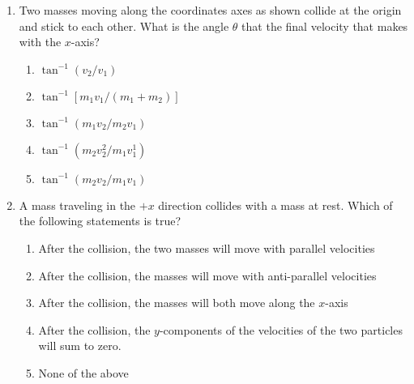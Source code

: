 \documentclass{../../../oss-apphys}
\begin{document}
\begin{multicols*}{2}
\begin{enumerate}[resume,leftmargin=18pt]
  \item Two masses moving along the coordinates axes as shown collide at the
    origin and stick to each other. What is the angle $\theta$ that the final
    velocity that makes with the $x$-axis?
    \begin{center}
    \end{center}
    \begin{enumerate}[nosep,leftmargin=18pt,label=(\Alph*)]
    \item $\tan^{-1}(v_2/v_1)$
    \item $\tan^{-1}[m_1v_1/(m_1+m_2)]$
    \item $\tan^{-1}(m_1v_2/m_2v_1)$
    \item $\tan^{-1}(m_2v_2^2/m_1v_1^1)$
    \item $\tan^{-1}(m_2v_2/m_1v_1)$
    \end{enumerate}
    \columnbreak
    
  \item A mass traveling in the $+x$ direction collides with a mass at rest.
    Which of the following statements is true?
    \begin{enumerate}[nosep,leftmargin=18pt,label=(\Alph*)]
    \item After the collision, the two masses will move with parallel velocities
    \item After the collision, the masses will move with anti-parallel
      velocities
    \item After the collision, the masses will both move along the $x$-axis
    \item After the collision, the $y$-components of the velocities of the two
      particles will sum to zero.
    \item None of the above
    \end{enumerate}
  \end{enumerate}
\end{multicols*}
\newpage
\end{document}
